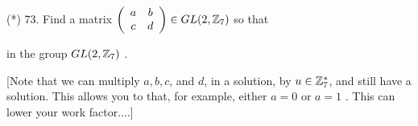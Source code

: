 \documentclass[12pt]{article}
\begin{document}
\begin{description}
\msk

\item{(*) 73.} Find a matrix $\left(\begin{array}{ccc} a & b \\ c & d \end{array}\right)\in GL(2,{\mathbb Z}_7)$ so that 

\ssk



\ssk

\item{\spc} in the group $GL(2,{\mathbb Z}_7)$ .

\ssk

\item{\spc} [Note that we can multiply $a,b,c$, and $d$, in a solution, by $u\in{\mathbb Z}_7^*$, and still have a solution. This allows you to 
 that, for example, either $a=0$ or $a=1$ . This can lower your work factor....]


\end{description}
\vfill
\end{document}

